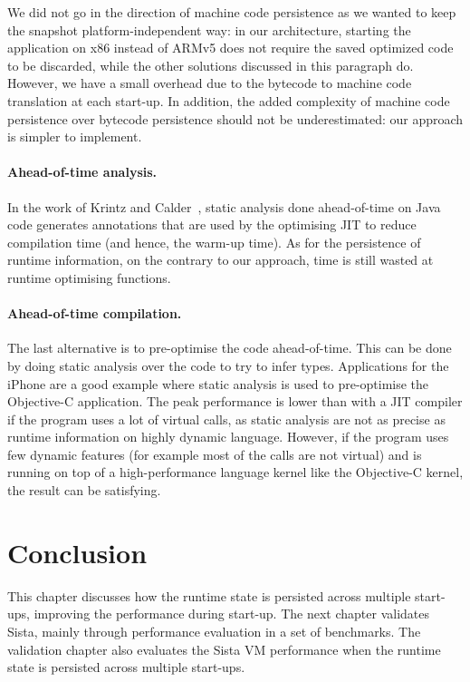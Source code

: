 \documentclass[a4paper,12pt,twoside]{../includes/ThesisStyle}
\begin{document}
We did not go in the direction of machine code persistence as we wanted to keep the snapshot platform-independent way: in our architecture, starting the application on x86 instead of ARMv5 does not require the saved optimized code to be discarded, while the other solutions discussed in this paragraph do. However, we have a small overhead due to the bytecode to machine code translation at each start-up. In addition, the added complexity of machine code persistence over bytecode persistence should not be underestimated: our approach is simpler to implement.

\paragraph{Ahead-of-time analysis.}

In the work of Krintz and Calder~\cite{Krin01a}, static analysis done ahead-of-time on Java code generates annotations that are used by the optimising JIT to reduce compilation time (and hence, the warm-up time). As for the persistence of runtime information, on the contrary to our approach, time is still wasted at runtime optimising functions.

\paragraph{Ahead-of-time compilation.}

The last alternative is to pre-optimise the code ahead-of-time. This can be done by doing static analysis over the code to try to infer types. Applications for the iPhone are a good example where static analysis is used to pre-optimise the Objective-C application. The peak performance is lower than with a JIT compiler if the program uses a lot of virtual calls, as static analysis are not as precise as runtime information on highly dynamic language. However, if the program uses few dynamic features (for example most of the calls are not virtual) and is running on top of a high-performance language kernel like the Objective-C kernel, the result can be satisfying.


\section*{Conclusion} This chapter discusses how the runtime state is persisted across multiple start-ups, improving the performance during start-up. The next chapter validates Sista, mainly through performance evaluation in a set of benchmarks. The validation chapter also evaluates the Sista VM performance when the runtime state is persisted across multiple start-ups.

\ifx\wholebook\relax\else
    
\end{document}
